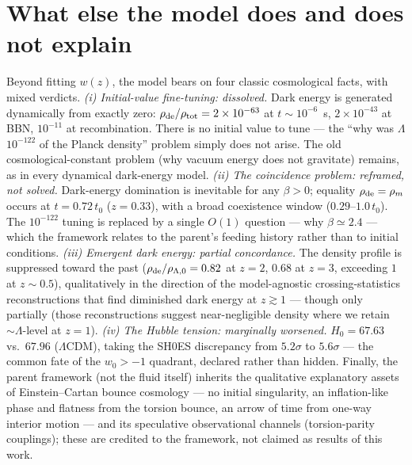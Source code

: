 \documentclass[11pt]{article}
\begin{document}
\section{What else the model does and does not explain}
Beyond fitting $w(z)$, the model bears on four classic cosmological facts, with mixed verdicts. \emph{(i) Initial-value fine-tuning: dissolved.} Dark energy is generated dynamically from exactly zero: $\rho_{\rm de}/\rho_{\rm tot} = 2\times10^{-63}$ at $t \sim 10^{-6}$~s, $2\times10^{-43}$ at BBN, $10^{-11}$ at recombination. There is no initial value to tune --- the ``why was $\Lambda$ $10^{-122}$ of the Planck density'' problem simply does not arise. The old cosmological-constant problem (why vacuum energy does not gravitate) remains, as in every dynamical dark-energy model. \emph{(ii) The coincidence problem: reframed, not solved.} Dark-energy domination is inevitable for any $\beta > 0$; equality $\rho_{\rm de} = \rho_m$ occurs at $t = 0.72\,t_0$ ($z = 0.33$), with a broad coexistence window ($0.29$--$1.0\,t_0$). The $10^{-122}$ tuning is replaced by a single $O(1)$ question --- why $\beta \simeq 2.4$ --- which the framework relates to the parent's feeding history rather than to initial conditions. \emph{(iii) Emergent dark energy: partial concordance.} The density profile is suppressed toward the past ($\rho_{\rm de}/\rho_{\Lambda,0} = 0.82$ at $z=2$, $0.68$ at $z=3$, exceeding $1$ at $z \sim 0.5$), qualitatively in the direction of the model-agnostic crossing-statistics reconstructions that find diminished dark energy at $z \gtrsim 1$ --- though only partially (those reconstructions suggest near-negligible density where we retain $\sim\Lambda$-level at $z=1$). \emph{(iv) The Hubble tension: marginally worsened.} $H_0 = 67.63$ vs.\ $67.96$ ($\Lambda$CDM), taking the SH0ES discrepancy from $5.2\sigma$ to $5.6\sigma$ --- the common fate of the $w_0 > -1$ quadrant, declared rather than hidden. Finally, the parent framework (not the fluid itself) inherits the qualitative explanatory assets of Einstein--Cartan bounce cosmology --- no initial singularity, an inflation-like phase and flatness from the torsion bounce, an arrow of time from one-way interior motion --- and its speculative observational channels (torsion-parity couplings); these are credited to the framework, not claimed as results of this work.
\end{document}
